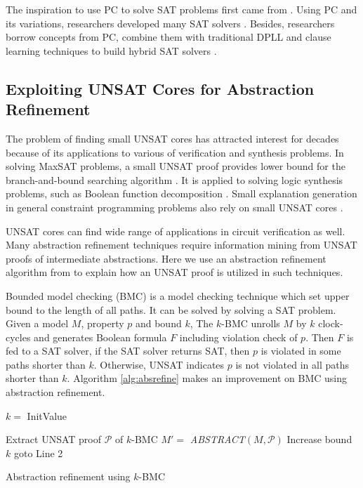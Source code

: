 The inspiration to use PC to solve SAT problems first came from \cite{ceiSTOC96}.
Using PC and its variations, researchers developed many SAT solvers \cite{STABLE,BLUEVERI,PolyBoRi}. 
Besides, researchers borrow concepts from PC, combine them with traditional DPLL and clause learning techniques
to build hybrid SAT solvers \cite{condratTACAS07,Zengler2010}.

\subsection{Exploiting UNSAT Cores for Abstraction Refinement}
The problem of finding small UNSAT cores has attracted interest for decades because of 
its applications to various of verification and synthesis problems.
In solving MaxSAT problems, a small UNSAT proof provides lower bound for the branch-and-bound searching algorithm \cite{li2009maxsat}.
It is applied to solving logic synthesis problems, such as Boolean function decomposition \cite{lee2008bi}. 
Small explanation generation in general constraint programming problems also rely on small UNSAT cores \cite{cambazard2008reformulating}.

UNSAT cores can find wide range of applications in circuit verification as well. Many abstraction refinement techniques require 
information mining from UNSAT proofs of intermediate abstractions. 
Here we use an abstraction refinement algorithm from \cite{zhang2005design} to explain how an UNSAT proof is
utilized in such techniques.

Bounded model checking (BMC) is a model checking technique which set upper bound to the length of all paths. 
It can be solved by solving a SAT problem. Given a model $M$, property $p$ and bound $k$, 
The $k$-BMC unrolls $M$ by $k$ clock-cycles and generates Boolean formula $F$ including violation check of $p$.
Then $F$ is fed to a SAT solver, if the SAT solver returns SAT, then $p$ is violated in 
some paths shorter than $k$. Otherwise, UNSAT indicates $p$ is not violated in all paths 
shorter than $k$. Algorithm \ref{alg:absrefine} makes an improvement on BMC using 
abstraction refinement.

\IncMargin{1em}
\begin{algorithm}[H]
\SetAlgoNoLine
\LinesNumbered
  $k = $ InitValue\;
  
  {
  }
  {
	Extract UNSAT proof $\mathcal P$ of $k$-BMC\;
	$M' = $ \textit{ABSTRACT}$(M,\mathcal P)$\;
  }
  {
  }
  {
	Increase bound $k$\;
	goto Line 2\;
  }
\caption {Abstraction refinement using $k$-BMC}\label{alg:absrefine}
\end{algorithm}
\DecMargin{1em}


